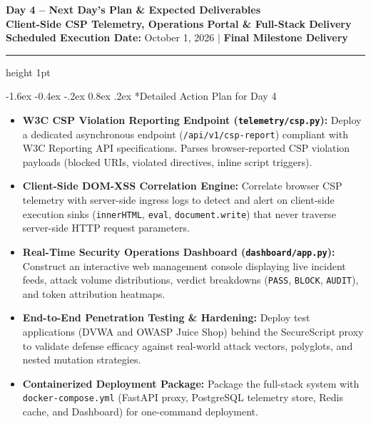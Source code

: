 \documentclass[11pt,a4paper]{article}
\makeatletter
\renewcommand{\section}{\@startsection{section}{1}{\z@}%
  {-1.6ex \@plus -0.4ex \@minus -.2ex}%
  {0.8ex \@plus .2ex}%
  {\normalfont\large\bfseries\color{primaryblue}}}
\makeatother
\begin{document}
\begin{center}
    {\LARGE \textbf{\color{primaryblue} Day 4 -- Next Day's Plan \& Expected Deliverables}} \\[0.25em]
    {\large \textbf{Client-Side CSP Telemetry, Operations Portal \& Full-Stack Delivery}} \\[0.2em]
    {\footnotesize \textbf{Scheduled Execution Date:} October 1, 2026 \quad $\vert$ \quad \textbf{Final Milestone Delivery}}
\end{center}

\vspace{0.3em}
\hrule height 1pt
\vspace{0.8em}

\section*{Detailed Action Plan for Day 4}
\begin{itemize}[leftmargin=1.5em, itemsep=2pt]
    \item \textbf{W3C CSP Violation Reporting Endpoint (\texttt{telemetry/csp.py}):}
    Deploy a dedicated asynchronous endpoint (\texttt{/api/v1/csp-report}) compliant with W3C Reporting API specifications. Parses browser-reported CSP violation payloads (blocked URIs, violated directives, inline script triggers).

    \item \textbf{Client-Side DOM-XSS Correlation Engine:}
    Correlate browser CSP telemetry with server-side ingress logs to detect and alert on client-side execution sinks (\texttt{innerHTML}, \texttt{eval}, \texttt{document.write}) that never traverse server-side HTTP request parameters.

    \item \textbf{Real-Time Security Operations Dashboard (\texttt{dashboard/app.py}):}
    Construct an interactive web management console displaying live incident feeds, attack volume distributions, verdict breakdowns (\texttt{PASS}, \texttt{BLOCK}, \texttt{AUDIT}), and token attribution heatmaps.

    \item \textbf{End-to-End Penetration Testing \& Hardening:}
    Deploy test applications (DVWA and OWASP Juice Shop) behind the SecureScript proxy to validate defense efficacy against real-world attack vectors, polyglots, and nested mutation strategies.

    \item \textbf{Containerized Deployment Package:}
    Package the full-stack system with \texttt{docker-compose.yml} (FastAPI proxy, PostgreSQL telemetry store, Redis cache, and Dashboard) for one-command deployment.
\end{itemize}
\end{document}
